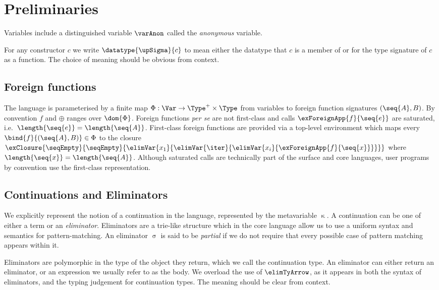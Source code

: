 \section{Preliminaries}
\label{sec:prelims}


Variables include a distinguished variable $\varAnon$ called the \emph{anonymous}
variable.

For any constructor $c$ we write $\datatype{\upSigma}{c}$ to mean either the datatype that $c$ is a member of
or for the type signature of $c$ as a function. The choice of meaning should be obvious from context.

\subsection{Foreign functions}

The language is parameterised by a finite map $\Phi: \Var \to \Type^+ \times \Type$ from variables to foreign
function signatures $(\seq{A}, B)$. By convention $f$ and $\oplus$ ranges over $\dom{\Phi}$. Foreign functions
\emph{per se} are not first-class and calls $\exForeignApp{f}{\seq{e}}$ are saturated, i.e.~$\length{\seq{e}}
= \length{\seq{A}}$. First-class foreign functions are provided via a top-level environment which maps every
$\bind{f}{(\seq{A}, B)} \in \Phi$ to the closure
$\exClosure{\seqEmpty}{\seqEmpty}{\elimVar{x_1}{\elimVar{\iter}{\elimVar{x_i}{\exForeignApp{f}{\seq{x}}}}}}$
where $\length{\seq{x}} = \length{\seq{A}}$. Although saturated calls are technically part of the surface and
core languages, user programs by convention use the first-class representation.

\subsection{Continuations and Eliminators}

We explicitly represent the notion of a continuation in the language, represented by the metavariable $\upkappa$.
A continuation can be one of either a term or an \textit{eliminator}. Eliminators are a trie-like structure which
in the core language allow us to use a uniform syntax and semantics for pattern-matching. An eliminator $\upsigma$
is said to be \textit{partial} if we do not require that every possible case of pattern matching appears within it.

Eliminators are polymorphic in the type of the object they return, which we call the continuation type. An eliminator
can either return an eliminator, or an expression we usually refer to as the body.
We overload the use of $\elimTyArrow$, as it appears in both the syntax of eliminators, and the typing judgement for
continuation types. The meaning should be clear from context.


